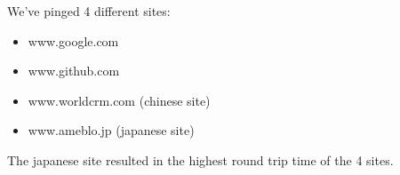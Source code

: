 We've pinged 4 different sites:
\begin{itemize}
	\item www.google.com
	\item www.github.com
	\item www.worldcrm.com (chinese site)
	\item www.ameblo.jp (japanese site)
\end{itemize}
The japanese site resulted in the highest round trip time of the 4 sites.





